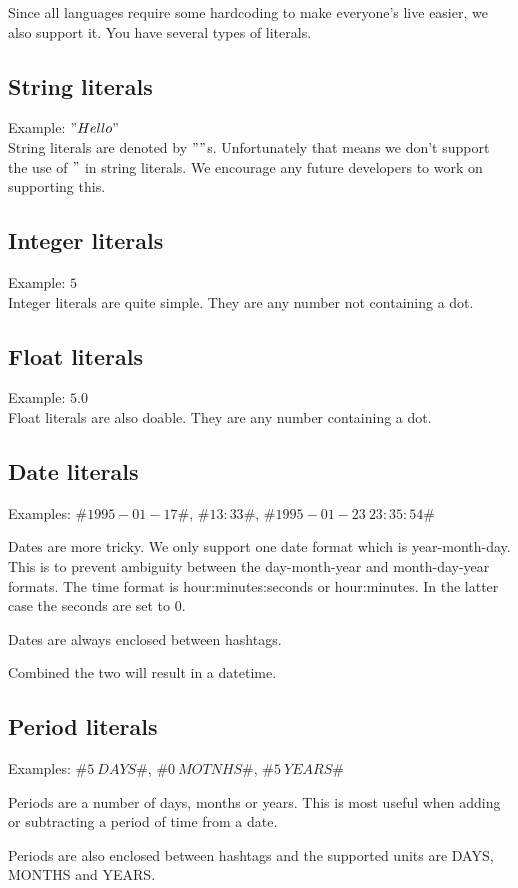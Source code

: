 Since all languages require some hardcoding to make everyone's live easier, we also support it. You have several types of literals.

\subsection{String literals}
Example: $"Hello"$ \\
String literals are denoted by $""$s. Unfortunately that means we don't support the use of $"$ in string literals. We encourage any future developers to work on supporting this.

\subsection{Integer literals}
Example: $5$ \\
Integer literals are quite simple. They are any number not containing a dot.

\subsection{Float literals}
Example: $5.0$ \\
Float literals are also doable. They are any number containing a dot.

\subsection{Date literals}
Examples: $\#1995-01-17\#$, $\#13:33\#$, $\#1995-01-23\ 23:35:54\#$

Dates are more tricky. We only support one date format which is year-month-day. This is to prevent ambiguity between the day-month-year and month-day-year formats. The time format is hour:minutes:seconds or hour:minutes. In the latter case the seconds are set to 0.

Dates are always enclosed between hashtags.

Combined the two will result in a datetime.

\subsection{Period literals}
Examples: $\#5\ DAYS\#$, $\#0\ MOTNHS\#$, $\#5\ YEARS\#$

Periods are a number of days, months or years. This is most useful when adding or subtracting a period of time from a date.

Periods are also enclosed between hashtags and the supported units are DAYS, MONTHS and YEARS.